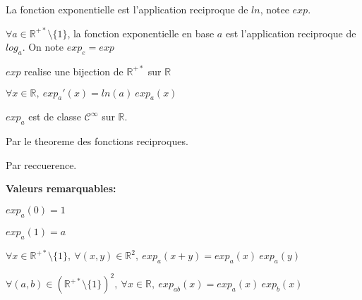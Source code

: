 \documentclass[12pt,twoside,a4paper]{article}
\author{MPSI 2}
\begin{document}
	\maketitle
	\begin{defi}
		\begin{liste}
			\item La fonction exponentielle est l'application reciproque de $ln$, notee $exp$.
			\item $\forall a\in\mathbb{R}^{+*}\setminus\{1\}$, la fonction exponentielle en base $a$ est l'application reciproque de $log_a$. On note $exp_e=exp$
		\end{liste}
	\end{defi}
	\begin{prop}
		\begin{liste}
			\item $exp$ realise une bijection de $\mathbb{R}^{+*}$ sur $\mathbb{R}$
			\item $\forall x\in\mathbb{R},\ exp_a'(x)=ln(a)\ exp_a(x)$
			\item $exp_a$ est de classe $\mathcal{C}^\infty$ sur $\mathbb{R}$.
		\end{liste}
	\end{prop}
	\begin{preuve}
			\begin{liste}
				\item Par le theoreme des fonctions reciproques.
				\item Par reccuerence.
			\end{liste}
	\end{preuve}
	\textbf{Valeurs remarquables:}
	\begin{tab}\begin{liste}
		\item $exp_a(0)=1$
		\item $exp_a(1)=a$
	\end{liste}\end{tab}
	\begin{prop}\begin{liste}
		\item $\forall x\in\mathbb{R}^{+*}\setminus\{1\},\ \forall(x,y)\in\mathbb{R}^2,\ exp_a(x+y)=exp_a(x)\ exp_a(y)$\\
		\item $\forall(a,b)\in\left(\mathbb{R}^{+*}\setminus\{1\}\right)^2,\ \forall x\in\mathbb{R},\ exp_{ab}(x)=exp_a(x)\ exp_b(x)$
	\end{liste}\end{prop}
\end{document}
